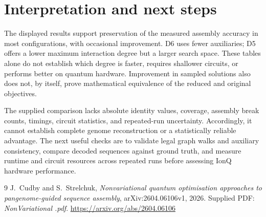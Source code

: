 \documentclass[10pt,letterpaper]{article}
\begin{document}
\section*{Interpretation and next steps}
The displayed results support preservation of the measured assembly accuracy
in most configurations, with occasional improvement. D6 uses fewer
auxiliaries; D5 offers a lower maximum interaction degree but a larger search
space. These tables alone do not establish which degree is faster, requires
shallower circuits, or performs better on quantum hardware. Improvement
in sampled solutions also does not, by itself, prove mathematical equivalence
of the reduced and original objectives.

The supplied comparison lacks absolute identity values, coverage, assembly
break counts, timings, circuit statistics, and repeated-run uncertainty.
Accordingly, it cannot establish complete genome reconstruction or a
statistically reliable advantage. The next useful checks are to validate
legal graph walks and auxiliary consistency, compare decoded sequences
against ground truth, and measure runtime and circuit resources across
repeated runs before assessing IonQ hardware performance.

\begin{thebibliography}{9}
\small
{}
J.~Cudby and S.~Strelchuk, \emph{Nonvariational quantum optimisation
approaches to pangenome-guided sequence assembly},
arXiv:2604.06106v1, 2026. Supplied PDF: \emph{NonVariational .pdf}.
\url{https://arxiv.org/abs/2604.06106}
\end{thebibliography}
\end{document}

